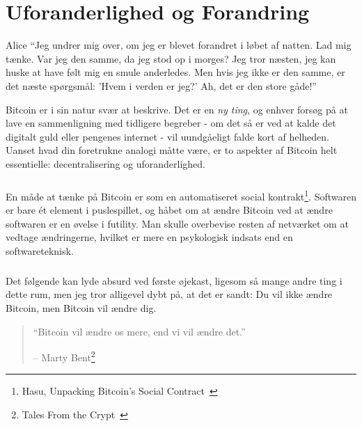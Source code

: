 \chapter{Uforanderlighed og Forandring}
\label{les:1}

\begin{chapquote}{Alice}
\enquote{Jeg undrer mig over, om jeg er blevet forandret i løbet af natten. Lad mig tænke.
Var jeg den samme, da jeg stod op i morges? Jeg tror næsten, jeg kan huske at have følt mig
en smule anderledes. Men hvis jeg ikke er den samme, er det næste spørgsmål: 'Hvem i verden er jeg?' Ah,
det er den store gåde!}
\end{chapquote}

Bitcoin er i sin natur svær at beskrive. Det er en \textit{ny ting}, og enhver
forsøg på at lave en sammenligning med tidligere begreber - om det så er ved at kalde
det digitalt guld eller pengenes internet - vil uundgåeligt falde kort
af helheden. Uanset hvad din foretrukne analogi måtte være, er to aspekter af
Bitcoin helt essentielle: decentralisering og uforanderlighed.

\paragraph{}
En måde at tænke på Bitcoin er som en automatiseret social kontrakt\footnote{Hasu,
Unpacking Bitcoin's Social Contract~\cite{social-contract}}. Softwaren er
bare ét element i puslespillet, og håbet om at ændre Bitcoin ved at ændre
softwaren er en øvelse i futility. Man skulle overbevise resten af
netværket om at vedtage ændringerne, hvilket er mere en psykologisk indsats end en
softwareteknisk.

\paragraph{}
Det følgende kan lyde absurd ved første øjekast, ligesom så mange andre ting i
dette rum, men jeg tror alligevel dybt på, at det er sandt: Du
vil ikke ændre Bitcoin, men Bitcoin vil ændre dig.

\begin{quotation}\begin{samepage}
\enquote{Bitcoin vil ændre os mere, end vi vil ændre det.}
\begin{flushright} -- Marty Bent\footnote{Tales From the Crypt~\cite{tftc21}}
\end{flushright}\end{samepage}\end{quotation}

